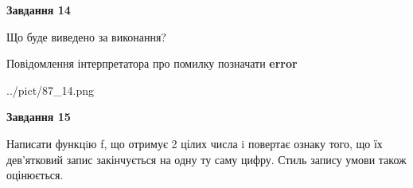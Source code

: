 \documentclass[11pt, ukrainian]{article}
\begin{document}
{\begin {large}
{\begin {center}\textbf{Завдання 14}\end {center}}\par
Що буде виведено за виконання? \par
Повідомлення інтерпретатора про помилку позначати \textbf{error}

\begin{center}
	{../pict/87_14.png}
\end{center}
\newpage

{\begin {center}\textbf{Завдання 15}\end {center}}\par

Написати функцiю f, що отримує 2 цілих числа i повертає ознаку того, що їх дев'ятковий запис закінчується на одну ту саму цифру. Стиль запису умови також оцінюється.\par
\newpage

\end {large}}
\end{document}
